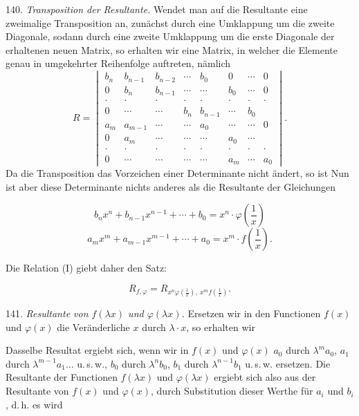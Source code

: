140. \textit{Transposition der Resultante.} Wendet man auf die Resultante eine zweimalige Transposition an, zunächst durch eine Umklappung um die zweite Diagonale, sodann durch eine zweite Umklappung um die erste Diagonale der erhaltenen neuen Matrix, so erhalten wir eine Matrix, in welcher die Elemente genau in umgekehrter Reihenfolge auftreten, nämlich
\[
R =
\begin{vmatrix}
b_n & b_{n-1} & b_{n-2} & \cdots & b_0 & 0 & \cdots & 0 \\
0 & b_n & b_{n-1} & \cdots & \cdots & b_0 & \cdots & 0 \\
\cdot & \cdot & \cdot & \cdot & \cdot & \cdot & \cdot & \cdot \\
0 & \cdots & \cdots & b_n & b_{n-1} & \cdots & b_0 & {} \\
a_m & a_{m-1} & \cdots & \cdots & a_0 & \cdots & \cdots & 0 \\
0 & a_m & \cdots & \cdots & \cdots & a_0 & \cdots & {} \\
\cdot & \cdot & \cdot & \cdot & \cdot & \cdot & \cdot & \cdot \\
0 & \cdots & \cdots & \cdots & \cdots & a_m & \cdots & a_0
\end{vmatrix}.
\]
Da die Transposition das Vorzeichen einer Determinante nicht ändert, so ist
Nun ist aber diese Determinante nichts anderes als die Resultante der Gleichungen


\[ b_n x^n + b_{n-1}x^{n-1} + \cdots + b_0 = x^n \cdot \varphi\left(\frac{1}{x}\right) \]
\[ a_m x^m + a_{m-1}x^{m-1} + \cdots + a_0 = x^m \cdot f\left(\frac{1}{x}\right). \]

Die Relation (I) giebt daher den Satz:

\[ R_{f,\varphi} = R_{x^n\varphi\left(\frac{1}{x}\right),\ x^mf\left(\frac{1}{x}\right)} . \]

141. \textit{Resultante von $f(\lambda x)$ und $\varphi(\lambda x)$.} Ersetzen wir in den
Functionen $f(x)$ und $\varphi(x)$ die Ver\"anderliche $x$ durch $\lambda \cdot x$, so erhalten
wir


Dasselbe Resultat ergiebt sich, wenn wir in $f(x)$ und $\varphi(x)$ $a_0$ durch
$\lambda^m a_0$, $a_1$ durch $\lambda^{m-1}a_1 \ldots$ u.\,s.\,w., $b_0$ durch
$\lambda^n b_0$, $b_1$ durch $\lambda^{n-1} b_1$ u.\,s.\,w. ersetzen. Die Resultante der
Functionen $f(\lambda x)$ und $\varphi(\lambda x)$ ergiebt sich also aus der Resultante von
$f(x)$ und $\varphi(x)$, durch Substitution dieser Werthe f\"ur $a_i$ und $b_i$, d.\,h. es
wird

